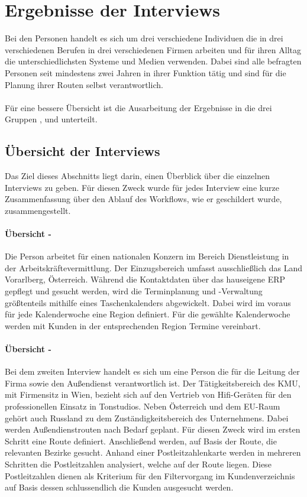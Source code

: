 \documentclass[Bachelorarbeit.tex]{subfiles}
\begin{document}
\section{Ergebnisse der Interviews}
Bei den Personen handelt es sich um drei verschiedene Individuen die in drei verschiedenen Berufen in drei verschiedenen Firmen arbeiten und für ihren Alltag die unterschiedlichsten Systeme und Medien verwenden. 
Dabei sind alle befragten Personen seit mindestens zwei Jahren in ihrer Funktion tätig und sind für die Planung ihrer Routen selbst verantwortlich.
\\
\\
Für eine bessere Übersicht ist die Ausarbeitung der Ergebnisse in die drei Gruppen
,  und  unterteilt. 


\subsection{Übersicht der Interviews}
\label{UebersichtDerInterviews}
Das Ziel dieses Abschnitts liegt darin, einen Überblick über die einzelnen Interviews zu geben. 
Für diesen Zweck wurde für jedes Interview eine kurze Zusammenfassung über den Ablauf des Workflows, wie er geschildert wurde, zusammengestellt.

\paragraph*{Übersicht - } 

Die Person arbeitet für einen nationalen Konzern im Bereich Dienstleistung in der Arbeitskräftevermittlung. 
Der Einzugsbereich umfasst ausschließlich das Land Vorarlberg, Österreich.
Während die Kontaktdaten über das hauseigene \ac{ERP} gepflegt und gesucht werden, wird die Terminplanung und -Verwaltung größtenteils mithilfe eines Taschenkalenders abgewickelt.
Dabei wird im voraus für jede Kalenderwoche eine Region definiert. 
Für die gewählte Kalenderwoche werden mit Kunden in der entsprechenden Region Termine vereinbart.\\


\paragraph*{Übersicht - }
Bei dem zweiten Interview handelt es sich um eine Person die für die Leitung der Firma sowie den Außendienst verantwortlich ist.
Der Tätigkeitsbereich des \ac{KMU}, mit Firmensitz in Wien, bezieht sich auf den Vertrieb von Hifi-Geräten für den professionellen Einsatz in Tonstudios.
Neben Österreich und dem EU-Raum gehört auch Russland zu dem Zuständigkeitsbereich des Unternehmens.
Dabei werden Außendienstrouten nach Bedarf geplant.
Für diesen Zweck wird im ersten Schritt eine Route definiert. 
Anschließend werden, auf Basis der Route, die relevanten Bezirke gesucht.
Anhand einer Postleitzahlenkarte werden in mehreren Schritten die Postleitzahlen analysiert, welche auf der Route liegen.
Diese Postleitzahlen dienen als Kriterium für den Filtervorgang im Kundenverzeichnis auf Basis dessen schlussendlich die Kunden ausgesucht werden.
\end{document}
